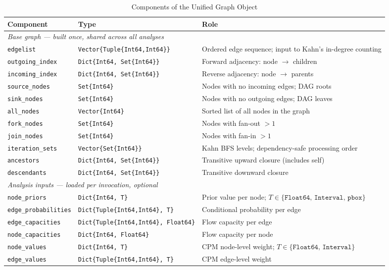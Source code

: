 \documentclass[12pt]{report}
\begin{document}
\begin{table}[htbp]
\centering
\caption{Components of the Unified Graph Object}
\label{tab:graph-object-components}
\small
\renewcommand{\arraystretch}{1.15}
\begin{tabular}{|l|l|p{}|}
\hline
\textbf{Component} & \textbf{Type} & \textbf{Role} \\
\hline
\multicolumn{3}{|l|}{\textit{Base graph --- built once, shared across all analyses}} \\
\hline
\texttt{edgelist} & \texttt{Vector\{Tuple\{Int64,Int64\}\}} & Ordered edge sequence; input to Kahn's in-degree counting \\
\texttt{outgoing\_index} & \texttt{Dict\{Int64, Set\{Int64\}\}} & Forward adjacency: node $\to$ children \\
\texttt{incoming\_index} & \texttt{Dict\{Int64, Set\{Int64\}\}} & Reverse adjacency: node $\to$ parents \\
\texttt{source\_nodes} & \texttt{Set\{Int64\}} & Nodes with no incoming edges; DAG roots \\
\texttt{sink\_nodes} & \texttt{Set\{Int64\}} & Nodes with no outgoing edges; DAG leaves \\
\texttt{all\_nodes} & \texttt{Vector\{Int64\}} & Sorted list of all nodes in the graph \\
\texttt{fork\_nodes} & \texttt{Set\{Int64\}} & Nodes with fan-out $> 1$ \\
\texttt{join\_nodes} & \texttt{Set\{Int64\}} & Nodes with fan-in $> 1$ \\
\texttt{iteration\_sets} & \texttt{Vector\{Set\{Int64\}\}} & Kahn BFS levels; dependency-safe processing order \\
\texttt{ancestors} & \texttt{Dict\{Int64, Set\{Int64\}\}} & Transitive upward closure (includes self) \\
\texttt{descendants} & \texttt{Dict\{Int64, Set\{Int64\}\}} & Transitive downward closure \\
\hline
\multicolumn{3}{|l|}{\textit{Analysis inputs --- loaded per invocation, optional}} \\
\hline
\texttt{node\_priors} & \texttt{Dict\{Int64, T\}} & Prior value per node; $T \in \{\texttt{Float64},\, \texttt{Interval},\, \texttt{pbox}\}$ \\
\texttt{edge\_probabilities} & \texttt{Dict\{Tuple\{Int64,Int64\}, T\}} & Conditional probability per edge \\
\texttt{edge\_capacities} & \texttt{Dict\{Tuple\{Int64,Int64\}, Float64\}} & Flow capacity per edge \\
\texttt{node\_capacities} & \texttt{Dict\{Int64, Float64\}} & Flow capacity per node \\
\texttt{node\_values} & \texttt{Dict\{Int64, T\}} & CPM node-level weight; $T \in \{\texttt{Float64},\, \texttt{Interval}\}$ \\
\texttt{edge\_values} & \texttt{Dict\{Tuple\{Int64,Int64\}, T\}} & CPM edge-level weight \\
\hline
\end{tabular}
\end{table}
\end{document}
